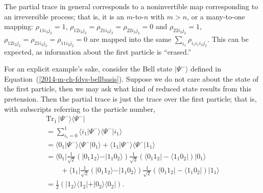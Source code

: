 The partial trace in general corresponds to a noninvertible map corresponding to an irreversible process; that is,
it is an $m$-to-$n$ with $m>n$, or a many-to-one mapping:
$\rho_{1 1 i_2 j_2} = 1$, $\rho_{1 2 i_2 j_2} =   \rho_{2 1 i_2 j_2} =  \rho_{2 2 i_2 j_2} = 0$
and
$\rho_{2 2 i_2 j_2} = 1$, $\rho_{1 2 i_2 j_2} =   \rho_{2 1 i_2 j_2} =  \rho_{1 1 i_2 j_2} = 0$
are mapped into the same  $ \sum_{i_1} \rho_{i_1 i_1 i_2 j_2}$.
This can be expected, as information about the first particle is ``erased.''



{\color{blue}
\bexample




\label{bellstate}
For an explicit example's sake, consider the Bell state         $\vert \Psi^- \rangle$
defined in Equation~(\ref{2014-m-ch-fdvs-bellbasis}).
Suppose we do not care about the state of the first particle, then we may ask what kind of reduced state results from this
pretension.
Then the partial trace is just the trace over the first particle; that is, with subscripts referring to the particle number,
\begin{equation}
\begin{split}
\textrm{Tr}_1\, \vert \Psi^- \rangle \langle  \Psi^-   \vert  \\
=\sum_{i_1=0}^1 \langle i_1 \vert \Psi^- \rangle \langle  \Psi^-  \vert i_1 \rangle \\
=\langle 0_1 \vert \Psi^- \rangle \langle  \Psi^-  \vert 0_1 \rangle
+
\langle 1_1  \vert \Psi^- \rangle \langle  \Psi^-  \vert 1_1 \rangle  \\
=\langle 0_1 \vert  \frac{1}{\sqrt{2}}\left(\vert 0_1   1_2 \rangle - \vert 1_1   0_2 \rangle  \right)  \frac{1}{\sqrt{2}}\left(\langle 0_1   1_2 \vert  - \langle 1_1   0_2 \vert   \right)  \vert 0_1 \rangle\\
\qquad
+
\langle 1_1 \vert  \frac{1}{\sqrt{2}}\left(\vert 0_1   1_2 \rangle - \vert 1_1   0_2 \rangle  \right)  \frac{1}{\sqrt{2}}\left(\langle 0_1   1_2 \vert  - \langle 1_1   0_2 \vert   \right)  \vert 1_1 \rangle  \\
= \frac{1}{2}
\left(
\vert 1_2 \rangle \langle   1_2 \vert
+
\vert 0_2 \rangle \langle   0_2 \vert
\right)
.
\end{split}
\end{equation}

}
